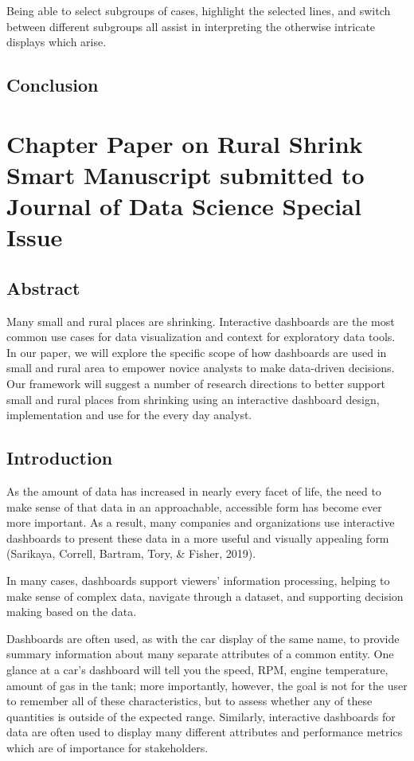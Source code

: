 \documentclass[print]{nuthesis}
\begin{document}
Being able to select subgroups of cases, highlight the selected lines, and switch between different subgroups all assist in interpreting the otherwise intricate displays which arise.

\hypertarget{conclusion}{%
\section{Conclusion}\label{conclusion}}

\hypertarget{rmd-basics}{%
\chapter{Chapter Paper on Rural Shrink Smart Manuscript submitted to Journal of Data Science Special Issue}\label{rmd-basics}}

\hypertarget{abstract}{%
\section{Abstract}\label{abstract}}

Many small and rural places are shrinking. Interactive dashboards are the most common use cases for data visualization and context for exploratory data tools. In our paper, we will explore the specific scope of how dashboards are used in small and rural area to empower novice analysts to make data-driven decisions. Our framework will suggest a number of research directions to better support small and rural places from shrinking using an interactive dashboard design, implementation and use for the every day analyst.

\hypertarget{introduction-1}{%
\section{Introduction}\label{introduction-1}}

As the amount of data has increased in nearly every facet of life, the need to make sense of that data in an approachable, accessible form has become ever more important.
As a result, many companies and organizations use interactive dashboards to present these data in a more useful and visually appealing form (Sarikaya, Correll, Bartram, Tory, \& Fisher, 2019).

In many cases, dashboards support viewers' information processing, helping to make sense of complex data, navigate through a dataset, and supporting decision making based on the data.

Dashboards are often used, as with the car display of the same name, to provide summary information about many separate attributes of a common entity. One glance at a car's dashboard will tell you the speed, RPM, engine temperature, amount of gas in the tank; more importantly, however, the goal is not for the user to remember all of these characteristics, but to assess whether any of these quantities is outside of the expected range.
Similarly, interactive dashboards for data are often used to display many different attributes and performance metrics which are of importance for stakeholders.
\end{document}
